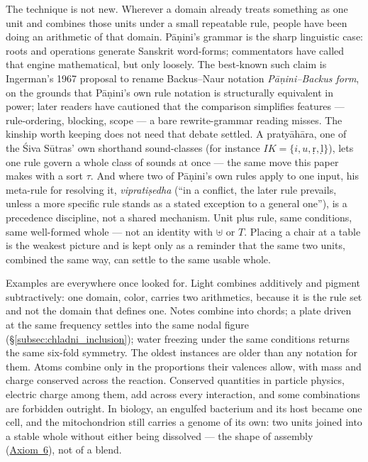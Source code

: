 \documentclass[12pt, a4paper]{article}
\begin{document}
The technique is not new. Wherever a domain already treats something
as one unit and combines those units under a small repeatable rule,
people have been doing an arithmetic of that domain. Pāṇini's grammar
is the sharp linguistic case: roots and operations generate Sanskrit
word-forms; commentators have called that engine mathematical, but
only loosely. The best-known such claim is Ingerman's 1967 proposal
to rename Backus--Naur notation \emph{Pāṇini--Backus form}, on the
grounds that Pāṇini's own rule notation is structurally equivalent in
power; later readers have cautioned that the comparison simplifies
features --- rule-ordering, blocking, scope --- a bare rewrite-grammar
reading misses. The kinship worth keeping does not need that debate
settled. A pratyāhāra, one of the Śiva Sūtras' own shorthand
sound-classes (for instance $IK=\{i,u,ṛ,ḷ\}$), lets one rule govern a
whole class of sounds at once --- the same move this paper makes with
a sort $\tau$. And where two of Pāṇini's own rules apply to one
input, his meta-rule for resolving it, \emph{vipratiṣedha} (``in a
conflict, the later rule prevails, unless a more specific rule stands
as a stated exception to a general one''), is a precedence
discipline, not a shared mechanism. Unit plus rule, same conditions,
same well-formed whole --- not an identity with $\uplus$ or $T$.
Placing a chair at a table is the weakest picture and is kept
only as a reminder that the same two units, combined the same way,
can settle to the same usable whole.

Examples are everywhere once looked for. Light combines additively
and pigment subtractively: one domain, color, carries two
arithmetics, because it is the rule set and not the domain that
defines one. Notes combine into chords; a plate driven at the same
frequency settles into the same nodal figure
(\S\ref{subsec:chladni_inclusion}); water freezing under the same
conditions returns the same six-fold symmetry. The oldest instances
are older than any notation for them. Atoms combine only in the
proportions their valences allow, with mass and charge conserved
across the reaction. Conserved quantities in particle physics,
electric charge among them, add across every interaction, and some
combinations are forbidden outright. In biology, an engulfed
bacterium and its host became one cell, and the mitochondrion still
carries a genome of its own: two units joined into a stable whole
without either being dissolved --- the shape of assembly
(\hyperref[subsec:axiom_assembly]{Axiom~6}), not of a blend.
\end{document}
